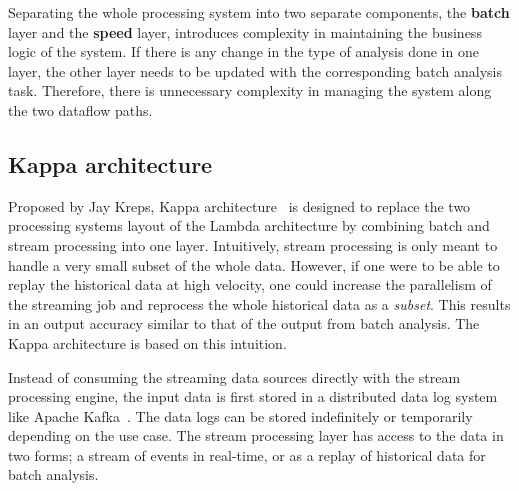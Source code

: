 Separating the whole processing system into two separate components, the \textbf{batch} layer and 
the \textbf{speed} layer, introduces complexity in maintaining the business logic of the system.
 If 
there is any change in the type of analysis done in one layer, the other layer needs to be updated 
with the corresponding batch analysis task. Therefore, there is unnecessary complexity in managing 
the system along the two dataflow paths. 
    

\subsection{Kappa architecture}%
\label{sub:Kappa architecture}
Proposed by Jay Kreps, Kappa architecture~\cite{kappa_architecture} is designed to replace the 
two processing systems layout of the Lambda architecture by combining batch and stream processing 
into one layer. Intuitively, stream processing is 
only meant to handle a very small subset of the whole data. However, if one were to be able 
to replay the historical data at high velocity, one could increase the parallelism of the streaming 
job and reprocess the whole historical data as a \emph{subset}. This results in an output accuracy similar
to that of the output from batch analysis. The Kappa architecture is based on this intuition.   

Instead of consuming the streaming data sources directly with the stream processing engine, 
the input data is first stored in a distributed data log system like Apache Kafka~\cite{kafka}. The data 
logs can be stored indefinitely or temporarily depending on the use case.
The stream processing layer has access to the data in two forms; 
a stream of events in real-time, or as a replay of historical data for batch analysis. 

